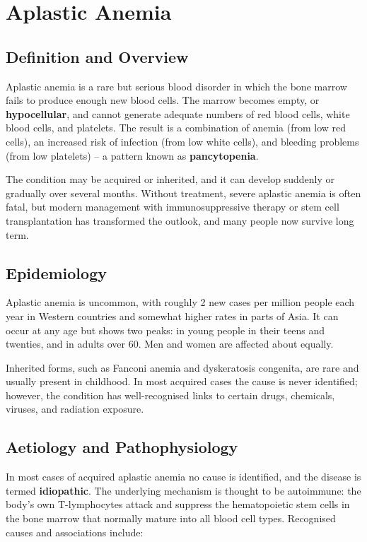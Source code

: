 \chapter{Aplastic Anemia}

\section*{Definition and Overview}
Aplastic anemia is a rare but serious blood disorder in which the bone marrow fails to produce enough new blood cells. The marrow becomes empty, or \textbf{hypocellular}, and cannot generate adequate numbers of red blood cells, white blood cells, and platelets. The result is a combination of anemia (from low red cells), an increased risk of infection (from low white cells), and bleeding problems (from low platelets) -- a pattern known as \textbf{pancytopenia}.

The condition may be acquired or inherited, and it can develop suddenly or gradually over several months. Without treatment, severe aplastic anemia is often fatal, but modern management with immunosuppressive therapy or stem cell transplantation has transformed the outlook, and many people now survive long term.

\section*{Epidemiology}
Aplastic anemia is uncommon, with roughly 2 new cases per million people each year in Western countries and somewhat higher rates in parts of Asia. It can occur at any age but shows two peaks: in young people in their teens and twenties, and in adults over 60. Men and women are affected about equally.

Inherited forms, such as Fanconi anemia and dyskeratosis congenita, are rare and usually present in childhood. In most acquired cases the cause is never identified; however, the condition has well-recognised links to certain drugs, chemicals, viruses, and radiation exposure.

\section*{Aetiology and Pathophysiology}
In most cases of acquired aplastic anemia no cause is identified, and the disease is termed \textbf{idiopathic}. The underlying mechanism is thought to be autoimmune: the body's own T-lymphocytes attack and suppress the hematopoietic stem cells in the bone marrow that normally mature into all blood cell types. Recognised causes and associations include:

